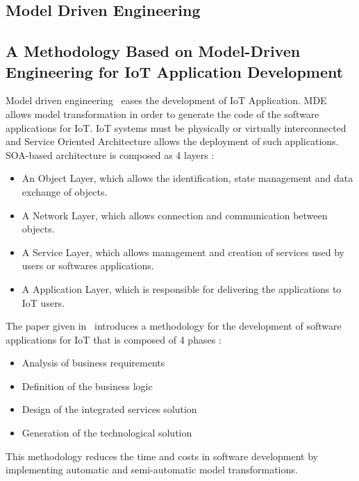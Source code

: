 
\subsection{Model Driven Engineering}

\subsection*{A Methodology Based on Model-Driven Engineering for IoT Application Development}
Model driven engineering~\cite{methodologyBasedMDE} eases the development of IoT Application. MDE allows model transformation in order to generate the code of the software applications for IoT. IoT systems must be physically or virtually interconnected and Service Oriented Architecture allows the deployment of such applications. SOA-based architecture is composed as 4 layers :
\begin{itemize}
    \item 
An Object Layer, which allows the identification, state management and data exchange of objects.
    \item
A Network Layer, which allows connection and communication between objects.
    \item A Service Layer, which allows management and creation of services used by users or softwares applications.
    \item
A Application Layer, which is responsible for delivering the applications to IoT users.

\end{itemize}

The paper given in~\cite{methodologyBasedMDE} introduces a methodology for the development of software applications for IoT that is composed of 4 phases : 
\begin{itemize}
    \item 
Analysis of business requirements
\item
Definition of the business logic
\item
Design of the integrated services solution
\item
Generation of the technological solution
\end{itemize}
This methodology reduces the time and costs in software development by implementing automatic and semi-automatic model transformations.

